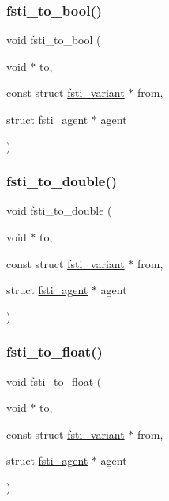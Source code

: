 \subsubsection{\texorpdfstring{fsti\+\_\+to\+\_\+bool()}{fsti\_to\_bool()}}
{\footnotesize\ttfamily void fsti\+\_\+to\+\_\+bool (\begin{DoxyParamCaption}\item[{void $\ast$}]{to,  }\item[{const struct \mbox{\hyperlink{structfsti__variant}{fsti\+\_\+variant}} $\ast$}]{from,  }\item[{struct \mbox{\hyperlink{structfsti__agent}{fsti\+\_\+agent}} $\ast$}]{agent }\end{DoxyParamCaption})}

\mbox{\label{fsti-events_8c_a89b0fd0e286b354aa15c5e5bbfc50bcb}} 
\subsubsection{\texorpdfstring{fsti\+\_\+to\+\_\+double()}{fsti\_to\_double()}}
{\footnotesize\ttfamily void fsti\+\_\+to\+\_\+double (\begin{DoxyParamCaption}\item[{void $\ast$}]{to,  }\item[{const struct \mbox{\hyperlink{structfsti__variant}{fsti\+\_\+variant}} $\ast$}]{from,  }\item[{struct \mbox{\hyperlink{structfsti__agent}{fsti\+\_\+agent}} $\ast$}]{agent }\end{DoxyParamCaption})}

\mbox{\label{fsti-events_8c_af4a768af0f5d827f7b40da95c29879da}} 
\subsubsection{\texorpdfstring{fsti\+\_\+to\+\_\+float()}{fsti\_to\_float()}}
{\footnotesize\ttfamily void fsti\+\_\+to\+\_\+float (\begin{DoxyParamCaption}\item[{void $\ast$}]{to,  }\item[{const struct \mbox{\hyperlink{structfsti__variant}{fsti\+\_\+variant}} $\ast$}]{from,  }\item[{struct \mbox{\hyperlink{structfsti__agent}{fsti\+\_\+agent}} $\ast$}]{agent }\end{DoxyParamCaption})}

